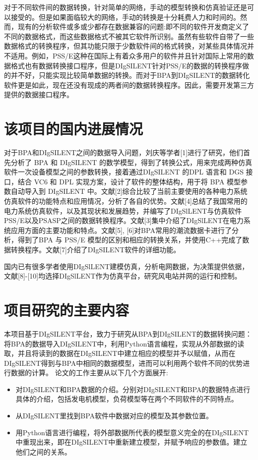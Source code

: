 对于不同软件间的数据转换，针对简单的网络，手动的模型转换和仿真验证还是可以接受的。但是如果面临较大的网络，手动的转换是十分耗费人力和时间的。然而，现有的分析软件或多或少都存在数据兼容的问题:即不同的软件开发商定义了不同的数据格式，而这些数据格式不被其它软件所识别。虽然有些软件自带了一些数据格式的转换程序，但其功能只限于少数软件间的格式转换，对某些具体情况并不适用。例如，PSS/E这种在国际上有着众多用户的软件并且针对国际上常用的数据格式也有数据转换接口程序，但是DIgSILENT针对PSS/E的数据的转换程序做的并不好，只能实现比较简单数据的转换。而对于BPA到DIgSILENT的数据转化软件更是如此，现在还没有现成的两者间的数据转换程序。因此，需要开发第三方提供的数据接口程序。

\section{该项目的国内进展情况}

对于BPA和DIgSILENT之间的数据导入问题，刘庆等学者[1]进行了研究，他们首先分析了 BPA 和 DIgSILENT 的数学模型，得到了转换公式，用来完成两种仿真软件一次设备模型之间的参数转换，接着通过DIgSILENT 的DPL 语言和 DGS 接口，结合 VC6 和 DPL 实现方案，设计了软件的整体结构，用于将 BPA 模型参数自动导入到 DIgSILENT 中。文献[2]综合比较了当前主要使用的各种电力系统仿真软件的功能特点和应用情况，分析了各自的优势。文献[4]总结了我国常用的电力系统仿真软件，以及其现状和发展趋势，并编写了DIgSlLENT与仿真软件PSS/E以及PSASP之间的数据转换程序。文献[3]集中介绍了DIgSlLENT在电力系统应用方面的主要功能和特点。文献[5], [6]对BPA常用的潮流数据卡进行了分
析，得到了BPA 与 PSS/E 模型的区别和相应的转换关系，并使用C++完成了数据转换程序。文献[7]介绍了DIgSILENT软件的详细功能。

国内已有很多学者使用DIgSlLENT建模仿真，分析电网数据，为决策提供依据，文献[8]-[10]均选择DIgSlLENT作为仿真平台，研究风电站并网的运行和控制。

\section{项目研究的主要内容}

本项目基于DIgSILENT平台，致力于研究从BPA到DIgSILENT的数据转换问题：将BPA的数据导入DIgSILENT中，利用Python语言编程，实现从外部数据的读取，并且将读到的数据在DIgSILENT中建立相应的模型并予以赋值，从而在DIgSILENT得到与BPA中相同的数据模型，进而可以利用两个软件不同的优势进行数据的计算。
论文的工作主要从以下几个方面展开:
\begin{itemize}
\item 对DIgSILENT和BPA数据的介绍。分别对DIgSILENT和BPA的数据特点进行具体的介绍，包括发电机模型，负荷模型等在两个不同软件的不同特点。
\item 从DIgSILENT里找到BPA软件中数据对应的模型及其参数位置。
\item 用Python语言进行编程，将外部数据所代表的模型意义完全的在DIgSILENT中重现出来，即在DIgSILENT中重新建立模型，并赋予响应的参数值。建立他们之间的关系。
\end{itemize}

